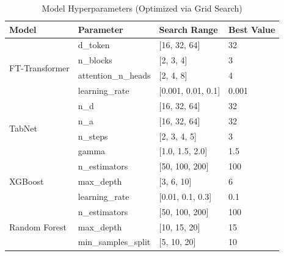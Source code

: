 \documentclass{article}
\begin{document}

\begin{table}[ht]
\centering
\caption{Model Hyperparameters (Optimized via Grid Search)}
\label{tab:hyperparameters}
\small
\begin{tabular}{llll}
\toprule
\textbf{Model} & \textbf{Parameter} & \textbf{Search Range} & \textbf{Best Value} \\
\midrule
\multirow{4}{*}{FT-Transformer} 
& d\_token          & [16, 32, 64]           & 32 \\
& n\_blocks         & [2, 3, 4]              & 3 \\
& attention\_n\_heads & [2, 4, 8]            & 4 \\
& learning\_rate    & [0.001, 0.01, 0.1]     & 0.001 \\
\midrule
\multirow{4}{*}{TabNet}
& n\_d              & [16, 32, 64]           & 32 \\
& n\_a              & [16, 32, 64]           & 32 \\
& n\_steps          & [2, 3, 4, 5]           & 3 \\
& gamma             & [1.0, 1.5, 2.0]        & 1.5 \\
\midrule
\multirow{3}{*}{XGBoost}
& n\_estimators     & [50, 100, 200]         & 100 \\
& max\_depth        & [3, 6, 10]             & 6 \\
& learning\_rate    & [0.01, 0.1, 0.3]       & 0.1 \\
\midrule
\multirow{3}{*}{Random Forest}
& n\_estimators     & [50, 100, 200]         & 100 \\
& max\_depth        & [10, 15, 20]           & 15 \\
& min\_samples\_split & [5, 10, 20]          & 10 \\
\bottomrule
\end{tabular}
\end{table}
\end{document}
